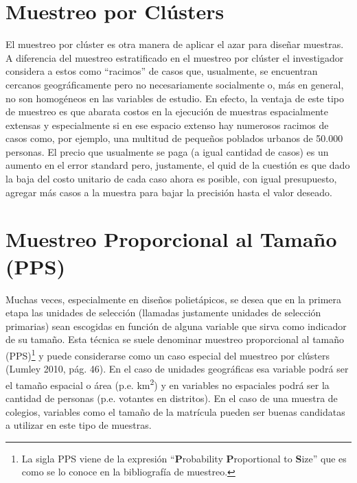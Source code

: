 \documentclass[
  spanish,
  a4paper,
]{scrreprt}
\begin{document}
\section{Muestreo por Clústers}\label{sec-clusters}

El muestreo por clúster es otra manera de aplicar el azar para diseñar
muestras. A diferencia del muestreo estratificado en el muestreo por
clúster el investigador considera a estos como ``racimos'' de casos que,
usualmente, se encuentran cercanos geográficamente pero no
necesariamente socialmente o, más en general, no son homogéneos en las
variables de estudio. En efecto, la ventaja de este tipo de muestreo es
que abarata costos en la ejecución de muestras espacialmente extensas y
especialmente si en ese espacio extenso hay numerosos racimos de casos
como, por ejemplo, una multitud de pequeños poblados urbanos de 50.000
personas. El precio que usualmente se paga (a igual cantidad de casos)
es un aumento en el error standard pero, justamente, el quid de la
cuestión es que dado la baja del costo unitario de cada caso ahora es
posible, con igual presupuesto, agregar más casos a la muestra para
bajar la precisión hasta el valor deseado.

\section{Muestreo Proporcional al Tamaño (PPS)}\label{sec-pps}

Muchas veces, especialmente en diseños polietápicos, se desea que en la
primera etapa las unidades de selección (llamadas justamente unidades de
selección primarias) sean escogidas en función de alguna variable que
sirva como indicador de su tamaño. Esta técnica se suele denominar
muestreo proporcional al tamaño (PPS)\footnote{La sigla PPS viene de la
  expresión ``\textbf{P}robability \textbf{P}roportional to
  \textbf{S}ize'' que es como se lo conoce en la bibliografía de
  muestreo.} y puede considerarse como un caso especial del muestreo por
clústers (Lumley 2010, pág. 46). En el caso de unidades geográficas esa
variable podrá ser el tamaño espacial o área (p.e.
km\textsuperscript{2}) y en variables no espaciales podrá ser la
cantidad de personas (p.e. votantes en distritos). En el caso de una
muestra de colegios, variables como el tamaño de la matrícula pueden ser
buenas candidatas a utilizar en este tipo de muestras.
\end{document}
